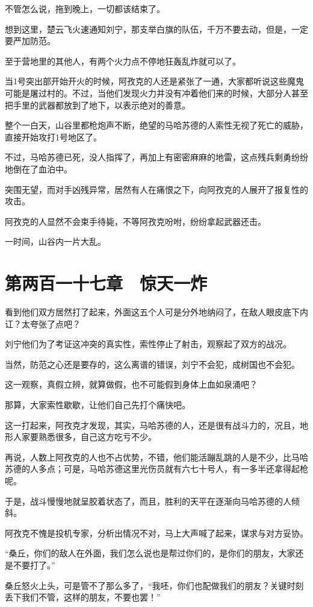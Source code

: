 不管怎么说，拖到晚上，一切都该结束了。

想到这里，楚云飞火速通知刘宁，那支举白旗的队伍，千万不要去动，但是，一定要严加防范。

至于营地里的其他人，有两个火力点不停地狂轰乱炸就可以了。

当1号突出部开始开火的时候，阿孜克的人还是紧张了一通，大家都听说这些魔鬼可能是屠过村的。不过，当他们发现火力并没有冲着他们来的时候，大部分人甚至把手里的武器都放到了地下，以表示绝对的善意。

整个一白天，山谷里都枪炮声不断，绝望的马哈苏德的人索性无视了死亡的威胁，直接开始攻打1号地区了。

不过，马哈苏德已死，没人指挥了，再加上有密密麻麻的地雷，这点残兵剩勇纷纷地倒在了血泊中。

突围无望，而对手凶残异常，居然有人在痛恨之下，向阿孜克的人展开了报复性的攻击。

阿孜克的人显然不会束手待毙，不等阿孜克吩咐，纷纷拿起武器还击。

一时间，山谷内一片大乱。

\section{第两百一十七章　惊天一炸}

看到他们双方居然打了起来，外面这五个人可是分外地纳闷了，在敌人眼皮底下内讧？太夸张了点吧？

刘宁他们为了考证这冲突的真实性，索性停止了射击，观察起了双方的战况。

当然，防范之心还是要存的，这么离谱的错误，刘宁不会犯，成树国也不会犯。

这一观察，真假立辨，就算做假，也不可能假到身体上血如泉涌吧？

那算，大家索性歇歇，让他们自己先打个痛快吧。

这一打起来，阿孜克才发现，其实，马哈苏德的人，还是很有战斗力的，况且，地形人家要熟悉很多，自己这方吃亏不少。

再说，人数上阿孜克的人也不占优势，不错，他们能活蹦乱跳的人是不少，比马哈苏德的人多点；可是，马哈苏德这里光伤员就有六七十号人，有一多半还拿得起枪呢。

于是，战斗慢慢地就呈胶着状态了，而且，胜利的天平在逐渐向马哈苏德的人倾斜。

阿孜克不愧是投机专家，分析出情况不对，马上大声喊了起来，谋求与对方妥协。

“桑丘，你们的敌人在外面，我们怎么说也是帮过你们的，是你们的朋友，大家还是不要打了。”

桑丘怒火上头，可是管不了那么多了，“我呸，你们也配做我们的朋友？关键时刻丢下我们不管，这样的朋友，不要也罢！”

